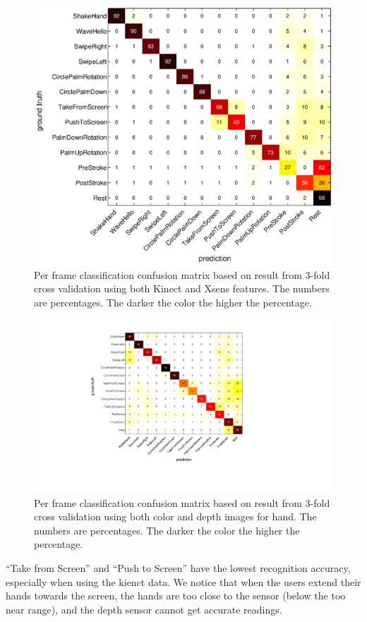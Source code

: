 \begin{figure}[h]
\centering
\includegraphics[trim={6cm 3.5cm 10cm 1.5cm}, clip,
width=1\columnwidth]{figures/confusion-matrix.eps} \caption{Per frame
classification confusion matrix based on result from 3-fold cross validation using both Kinect and Xsens features. The numbers are percentages. The darker the color the higher the percentage.}
\label{fig:confusion}
\end{figure}

\begin{figure}[tb]
\centering
\includegraphics[trim={6cm 3.5cm 10cm 1.5cm}, clip,
width=1\columnwidth]{figures/confusion_color_depth.png} \caption{Per frame
classification confusion matrix based on result from 3-fold cross validation using 
both color and depth images for hand. The numbers are percentages. The darker
the color the higher the percentage.}
\label{fig:confusion}
\end{figure}

``Take from Screen'' and ``Push to Screen'' have the lowest recognition
accuracy, especially when using the kienct data. We notice that when the users
extend their hands towards the screen, the hands are too close to the sensor
(below the too near range), and the depth sensor cannot get accurate readings.

